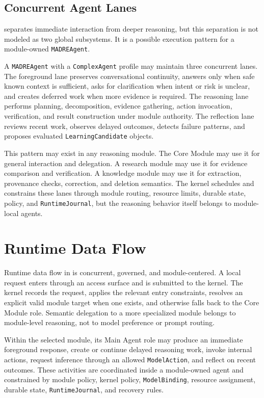 \documentclass[11pt]{report}
\begin{document}
\subsection{Concurrent Agent Lanes}

\Madre separates immediate interaction from deeper reasoning, but this separation is not modeled as two global subsystems. It is a possible execution pattern for a module-owned \texttt{MADREAgent}.

A \texttt{MADREAgent} with a \texttt{ComplexAgent} profile may maintain three concurrent lanes. The foreground lane preserves conversational continuity, answers only when safe known context is sufficient, asks for clarification when intent or risk is unclear, and creates deferred work when more evidence is required. The reasoning lane performs planning, decomposition, evidence gathering, action invocation, verification, and result construction under module authority. The reflection lane reviews recent work, observes delayed outcomes, detects failure patterns, and proposes evaluated \texttt{LearningCandidate} objects.

This pattern may exist in any reasoning module. The Core Module may use it for general interaction and delegation. A research module may use it for evidence comparison and verification. A knowledge module may use it for extraction, provenance checks, correction, and deletion semantics. The kernel schedules and constrains these lanes through module routing, resource limits, durable state, policy, and \texttt{RuntimeJournal}, but the reasoning behavior itself belongs to module-local agents.

\section{Runtime Data Flow}

Runtime data flow in \Madre is concurrent, governed, and module-centered. A local request enters through an access surface and is submitted to the kernel. The kernel records the request, applies the relevant entry constraints, resolves an explicit valid module target when one exists, and otherwise falls back to the Core Module role. Semantic delegation to a more specialized module belongs to module-level reasoning, not to model preference or prompt routing.

Within the selected module, its Main Agent role may produce an immediate foreground response, create or continue delayed reasoning work, invoke internal actions, request inference through an allowed \texttt{ModelAction}, and reflect on recent outcomes. These activities are coordinated inside a module-owned agent and constrained by module policy, kernel policy, \texttt{ModelBinding}, resource assignment, durable state, \texttt{RuntimeJournal}, and recovery rules.
\end{document}
